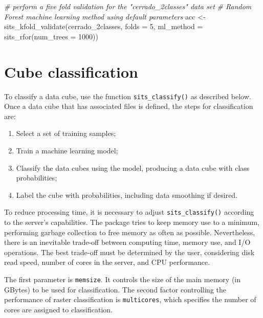 \documentclass[a4paper,]{tufte-book}
\newenvironment{Shaded}{}{}
\newcommand{\AttributeTok}[1]{\textcolor[rgb]{0.49,0.56,0.16}{#1}}
\newcommand{\CommentTok}[1]{\textcolor[rgb]{0.38,0.63,0.69}{\textit{#1}}}
\newcommand{\DecValTok}[1]{\textcolor[rgb]{0.25,0.63,0.44}{#1}}
\newcommand{\FunctionTok}[1]{\textcolor[rgb]{0.02,0.16,0.49}{#1}}
\newcommand{\NormalTok}[1]{#1}
\newcommand{\OtherTok}[1]{\textcolor[rgb]{0.00,0.44,0.13}{#1}}
\providecommand{\tightlist}{%
  \setlength{\itemsep}{0pt}\setlength{\parskip}{0pt}}
\begin{document}
\begin{Shaded}
\begin{Highlighting}[]
\CommentTok{\# perform a five fold validation for the "cerrado\_2classes" data set}
\CommentTok{\# Random Forest machine learning method using default parameters}
\NormalTok{acc }\OtherTok{\textless{}{-}} \FunctionTok{sits\_kfold\_validate}\NormalTok{(cerrado\_2classes, }
                           \AttributeTok{folds =} \DecValTok{5}\NormalTok{, }
                           \AttributeTok{ml\_method =} \FunctionTok{sits\_rfor}\NormalTok{(}\AttributeTok{num\_trees =} \DecValTok{1000}\NormalTok{))}
\end{Highlighting}
\end{Shaded}

\hypertarget{cube-classification}{%
\section{Cube classification}\label{cube-classification}}

To classify a data cube, use the function \texttt{sits\_classify()} as described below. Once a data cube that has associated files is defined, the steps for classification are:

\begin{enumerate}
\def\labelenumi{\arabic{enumi}.}
\tightlist
\item
  Select a set of training samples;
\item
  Train a machine learning model;
\item
  Classify the data cubes using the model, producing a data cube with class probabilities;
\item
  Label the cube with probabilities, including data smoothing if desired.
\end{enumerate}

To reduce processing time, it is necessary to adjust \texttt{sits\_classify()} according to the server's capabilities. The package tries to keep memory use to a minimum, performing garbage collection to free memory as often as possible. Nevertheless, there is an inevitable trade-off between computing time, memory use, and I/O operations. The best trade-off must be determined by the user, considering disk read speed, number of cores in the server, and CPU performance.

The first parameter is \texttt{memsize}. It controls the size of the main memory (in GBytes) to be used for classification. The second factor controlling the performance of raster classification is \texttt{multicores}, which specifies the number of cores are assigned to classification.
\end{document}
